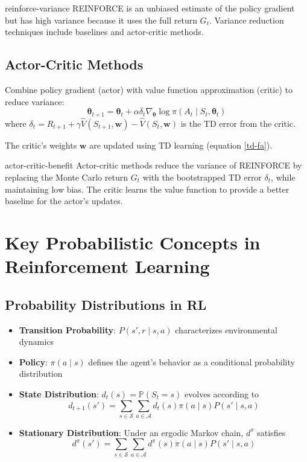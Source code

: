 \documentclass[a4paper, 11pt]{article}
\numberwithin{equation}{section}
\theoremstyle{plain}
\theoremstyle{definition}
\renewcommand{\P}{\mathbb{P}}
\newcommand{\1}{{\mathbbm 1}}
\newcommand{\mb}[1]{\mathbf{#1}}
\newcommand{\mc}[1]{\mathcal{#1}}
\begin{document}
	\begin{frema}{}{reinforce-variance}
		REINFORCE is an unbiased estimate of the policy gradient but has high variance because it uses the full return $G_t$. Variance reduction techniques include baselines and actor-critic methods.
	\end{frema}
	
	\subsection{Actor-Critic Methods}
	
	Combine policy gradient (actor) with value function approximation (critic) to reduce variance:
	\begin{equation}\label{actor-critic}
		\boldsymbol{\theta}_{t+1} = \boldsymbol{\theta}_t + \alpha \delta_t \nabla_{\boldsymbol{\theta}} \log \pi(A_t\;|\; S_t, \boldsymbol{\theta}_t)
	\end{equation}
	where $\delta_t = R_{t+1} + \gamma \hat{V}(S_{t+1}, \mb{w}) - \hat{V}(S_t, \mb{w})$ is the TD error from the critic.
	
	The critic's weights $\mb{w}$ are updated using TD learning (equation \eqref{td-fa}).
	
	\begin{frema}{}{actor-critic-benefit}
		Actor-critic methods reduce the variance of REINFORCE by replacing the Monte Carlo return $G_t$ with the bootstrapped TD error $\delta_t$, while maintaining low bias. The critic learns the value function to provide a better baseline for the actor's updates.
	\end{frema}
	
	\section{Key Probabilistic Concepts in Reinforcement Learning}
	
	\subsection{Probability Distributions in RL}
	
	\begin{itemize}
		\item \textbf{Transition Probability}: $P(s', r\;|\; s, a)$ characterizes environmental dynamics
		\item \textbf{Policy}: $\pi(a\;|\; s)$ defines the agent's behavior as a conditional probability distribution
		\item \textbf{State Distribution}: $d_t(s) = \P(S_t = s)$ evolves according to
		\begin{equation}
			d_{t+1}(s') = \sum_{s \in \mc{S}} \sum_{a \in \mc{A}} d_t(s) \pi(a\;|\; s) P(s'\;|\; s, a)
		\end{equation}
		\item \textbf{Stationary Distribution}: Under an ergodic Markov chain, $d^{\pi}$ satisfies
		\begin{equation}
			d^{\pi}(s') = \sum_{s \in \mc{S}} \sum_{a \in \mc{A}} d^{\pi}(s) \pi(a\;|\; s) P(s'\;|\; s, a)
		\end{equation}
	\end{itemize}
	
\end{document}
